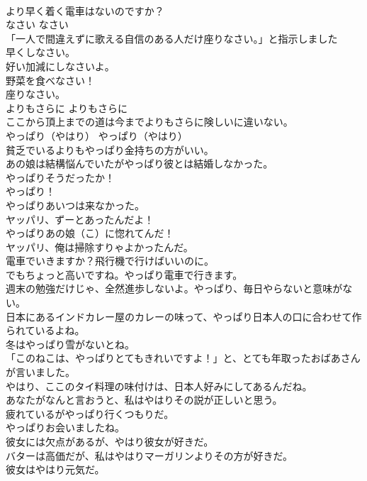 \documentclass[8pt]{extreport}
\begin{document}
\begin{CJK}{UTF8}{min}
\\	より早く着く電車はないのですか？  
\\	なさい	なさい	
\\	「一人で間違えずに歌える自信のある人だけ座りなさい。」と指示しました  
\\	早くしなさい。  
\\	好い加減にしなさいよ。  
\\	野菜を食べなさい！   
\\	座りなさい。  
\\	よりもさらに	よりもさらに	
\\	ここから頂上までの道は今までよりもさらに険しいに違いない。  
\\	やっぱり（やはり）	やっぱり（やはり）	
\\	貧乏でいるよりもやっぱり金持ちの方がいい。  
\\	あの娘は結構悩んでいたがやっぱり彼とは結婚しなかった。  
\\	やっぱりそうだったか！  
\\	やっぱり！  
\\	やっぱりあいつは来なかった。  
\\	ヤッパリ、ずーとあったんだよ！  
\\	やっぱりあの娘（こ）に惚れてんだ！  
\\	ヤッパリ、俺は掃除すりゃよかったんだ。  
\\	電車でいきますか？飛行機で行けばいいのに。 
\\	でもちょっと高いですね。やっぱり電車で行きます。  
\\	週末の勉強だけじゃ、全然進歩しないよ。やっぱり、毎日やらないと意味がない。  
\\	日本にあるインドカレー屋のカレーの味って、やっぱり日本人の口に合わせて作られているよね。  
\\	冬はやっぱり雪がないとね。  
\\	「このねこは、やっぱりとてもきれいですよ！」と、とても年取ったおばあさんが言いました。  
\\	やはり、ここのタイ料理の味付けは、日本人好みにしてあるんだね。  
\\	あなたがなんと言おうと、私はやはりその説が正しいと思う。  
\\	疲れているがやっぱり行くつもりだ。   
\\	やっぱりお会いましたね。   
\\	彼女には欠点があるが、やはり彼女が好きだ。   
\\	バターは高価だが、私はやはりマーガリンよりその方が好きだ。   
\\	彼女はやはり元気だ。   

\end{CJK}
\end{document}
